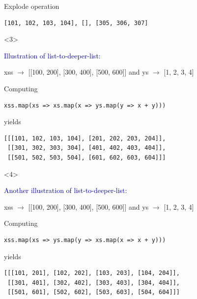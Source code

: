 \documentclass{beamer}
\begin{document}
\begin{frame}[fragile]{Explode operation}
\begin{onlyenv}
\begin{center}
\begin{minipage}{0.8\linewidth}
\vspace{-0.4 cm}
\begin{verbatim}
[101, 102, 103, 104], [], [305, 306, 307]
\end{verbatim}
\end{minipage}
\end{center}
\end{onlyenv}
\begin{onlyenv}<3>
\begin{center}
\begin{minipage}{0.8\linewidth}
\scriptsize
\vspace{0.3 cm}
\textcolor{darkblue}{Illustration of list-to-deeper-list:}

\vspace{0.2 cm}
xss $\to$ [[100, 200], [300, 400], [500, 600]] and ys $\to$ [1, 2, 3, 4]

\vspace{0.2 cm}
Computing
\begin{verbatim}
xss.map(xs => xs.map(x => ys.map(y => x + y)))
\end{verbatim}

yields

\vspace{-0.4 cm}
\begin{verbatim}
[[[101, 102, 103, 104], [201, 202, 203, 204]],
 [[301, 302, 303, 304], [401, 402, 403, 404]],
 [[501, 502, 503, 504], [601, 602, 603, 604]]]
\end{verbatim}
\end{minipage}
\end{center}
\end{onlyenv}
\begin{onlyenv}<4>
\begin{center}
\begin{minipage}{0.8\linewidth}
\scriptsize
\vspace{0.3 cm}
\textcolor{darkblue}{Another illustration of list-to-deeper-list:}

\vspace{0.2 cm}
xss $\to$ [[100, 200], [300, 400], [500, 600]] and ys $\to$ [1, 2, 3, 4]

\vspace{0.2 cm}
Computing
\begin{verbatim}
xss.map(xs => ys.map(y => xs.map(x => x + y)))
\end{verbatim}

yields

\vspace{-0.4 cm}
\begin{verbatim}
[[[101, 201], [102, 202], [103, 203], [104, 204]],
 [[301, 401], [302, 402], [303, 403], [304, 404]],
 [[501, 601], [502, 602], [503, 603], [504, 604]]]
\end{verbatim}
\end{minipage}
\end{center}
\end{onlyenv}
\end{frame}
\end{document}
